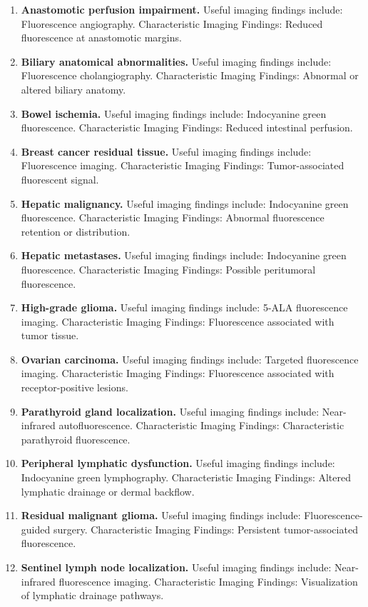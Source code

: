 \begin{enumerate}[leftmargin=*,itemsep=0.45em,topsep=0.4em]
\item \textbf{Anastomotic perfusion impairment.} Useful imaging findings include: Fluorescence angiography. Characteristic Imaging Findings: Reduced fluorescence at anastomotic margins.
\item \textbf{Biliary anatomical abnormalities.} Useful imaging findings include: Fluorescence cholangiography. Characteristic Imaging Findings: Abnormal or altered biliary anatomy.
\item \textbf{Bowel ischemia.} Useful imaging findings include: Indocyanine green fluorescence. Characteristic Imaging Findings: Reduced intestinal perfusion.
\item \textbf{Breast cancer residual tissue.} Useful imaging findings include: Fluorescence imaging. Characteristic Imaging Findings: Tumor-associated fluorescent signal.
\item \textbf{Hepatic malignancy.} Useful imaging findings include: Indocyanine green fluorescence. Characteristic Imaging Findings: Abnormal fluorescence retention or distribution.
\item \textbf{Hepatic metastases.} Useful imaging findings include: Indocyanine green fluorescence. Characteristic Imaging Findings: Possible peritumoral fluorescence.
\item \textbf{High-grade glioma.} Useful imaging findings include: 5-ALA fluorescence imaging. Characteristic Imaging Findings: Fluorescence associated with tumor tissue.
\item \textbf{Ovarian carcinoma.} Useful imaging findings include: Targeted fluorescence imaging. Characteristic Imaging Findings: Fluorescence associated with receptor-positive lesions.
\item \textbf{Parathyroid gland localization.} Useful imaging findings include: Near-infrared autofluorescence. Characteristic Imaging Findings: Characteristic parathyroid fluorescence.
\item \textbf{Peripheral lymphatic dysfunction.} Useful imaging findings include: Indocyanine green lymphography. Characteristic Imaging Findings: Altered lymphatic drainage or dermal backflow.
\item \textbf{Residual malignant glioma.} Useful imaging findings include: Fluorescence-guided surgery. Characteristic Imaging Findings: Persistent tumor-associated fluorescence.
\item \textbf{Sentinel lymph node localization.} Useful imaging findings include: Near-infrared fluorescence imaging. Characteristic Imaging Findings: Visualization of lymphatic drainage pathways.
\end{enumerate}

